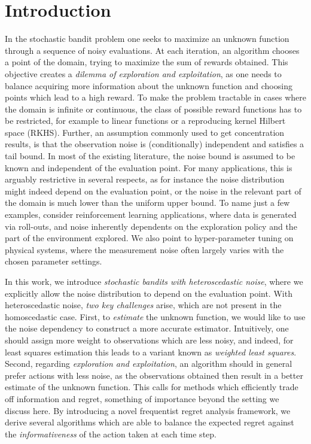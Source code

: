 \newcommand{\UCB}{\text{UCB}}
\newcommand{\TS}{\text{TS}}
\newcommand{\F}{\text{F}}
\newcommand{\IDS}{\text{IDS}}
\newcommand{\DIDS}{\text{DIDS}}

\section{Introduction}
In the stochastic bandit problem one seeks to maximize an unknown function through a sequence of noisy evaluations. At each iteration, an algorithm chooses a point of the domain, trying to maximize the sum of rewards obtained. This objective creates a \emph{dilemma of exploration and exploitation}, as one needs to balance acquiring more information about the unknown function and choosing points which lead to a high reward. To make the problem tractable in cases where the domain is infinite or continuous, the class of possible reward functions has to be restricted, for example to linear functions or a reproducing kernel Hilbert space (RKHS). Further, an assumption commonly used to get concentration results, is that the observation noise is (conditionally) independent and satisfies a tail bound. In most of the existing literature, the noise bound is assumed to be known and independent of the evaluation point. For many applications, this is arguably restrictive in several respects, as for instance the noise distribution might indeed depend on the evaluation point, or the noise in the relevant part of the domain is much lower than the uniform upper bound. To name just a few examples, consider reinforcement learning applications, where data is generated via roll-outs, and noise inherently dependents on the exploration policy and the part of the environment explored. We also point to hyper-parameter tuning on physical systems, where the measurement noise often largely varies with the chosen parameter settings. 

In this work, we introduce \emph{stochastic bandits with heteroscedastic noise}, where we explicitly allow the noise distribution to depend on the evaluation point. With heteroscedastic noise, \emph{two key challenges} arise, which are not present in the homoscedastic case. First, to \emph{estimate} the unknown function, we would like to use the noise dependency to construct a more accurate estimator. Intuitively, one should assign more weight to observations which are less noisy, and indeed, for least squares estimation this leads to a variant known as \emph{weighted least squares}. Second, regarding \emph{exploration and exploitation}, an algorithm should in general prefer actions with less noise, as the observations obtained then result in a better estimate of the unknown function. This calls for methods which efficiently trade off information and regret, something of importance beyond the setting we discuss here. By introducing a novel frequentist regret analysis framework, we derive several algorithms which are able to balance the expected regret against the \emph{informativeness} of the action taken at each time step.

